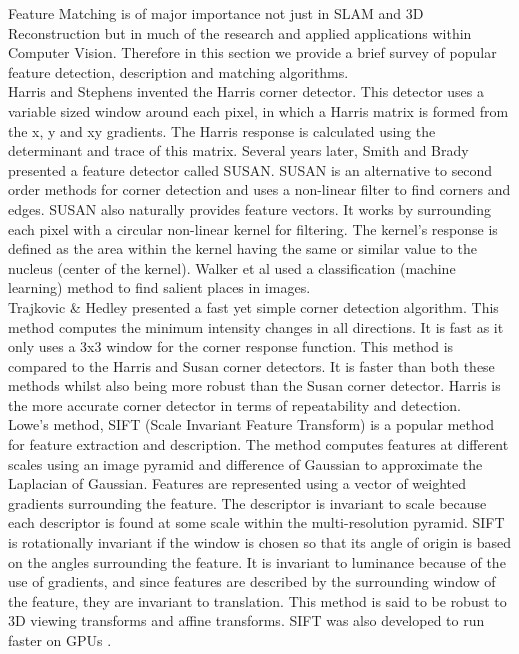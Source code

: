 Feature Matching is of major importance not just in SLAM and 3D Reconstruction but in much of the research and applied applications within Computer Vision. Therefore in this section we provide a brief survey of popular feature detection, description and matching algorithms. \\

Harris and Stephens \cite{Harris88Combined} invented the Harris corner detector. This detector uses a variable sized window around each pixel, in which a Harris matrix is formed from the x, y and xy gradients. The Harris response is calculated using the determinant and trace of this matrix. Several years later, Smith and Brady \cite{Smith97Susan, Smith92New} presented a feature detector called SUSAN. SUSAN is an alternative to second order methods for corner detection and uses a non-linear filter to find corners and edges. SUSAN also naturally provides feature vectors. It works by surrounding each pixel with a circular non-linear kernel for filtering. The kernel's response is defined as the area within the kernel having the same or similar value to the nucleus (center of the kernel). Walker et al \cite{Walker98Locating} used a classification (machine learning) method to find salient places in images.\\


Trajkovic \& Hedley \cite{Trajkovic98Fast} presented a fast yet simple corner detection algorithm. This method computes the minimum intensity changes in all directions. It is fast as it only uses a 3x3 window for the corner response function. This method is compared to the Harris and Susan corner detectors. It is faster than both these methods whilst also being more robust than the Susan corner detector. Harris is the more accurate corner detector in terms of repeatability and detection.\\


Lowe's \cite{Lowe04Distinctive,Lowe99Object} method, SIFT (Scale Invariant Feature Transform) is a popular method for feature extraction and description. The method computes features at different scales using an image pyramid and difference of Gaussian to approximate the Laplacian of Gaussian. Features are represented using a vector of weighted gradients surrounding the feature. The descriptor is invariant to scale because each descriptor is found at some scale within the multi-resolution pyramid. SIFT is rotationally invariant if the window is chosen so that its angle of origin is based on the angles surrounding the feature. It is invariant to luminance because of the use of gradients, and since features are described by the surrounding window of the feature, they are invariant to translation. This method is said to be robust to 3D viewing transforms and affine transforms. SIFT was also developed to run faster on GPUs \cite{Wu07Siftgpu}. \\


